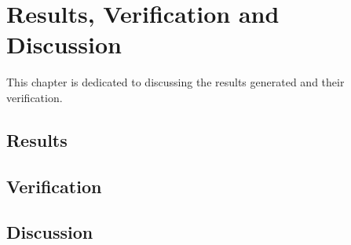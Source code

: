 \chapter{Results, Verification and Discussion}
This chapter is dedicated to discussing the results generated and their verification. 

\section{Results}





\section{Verification}





\section{Discussion}





